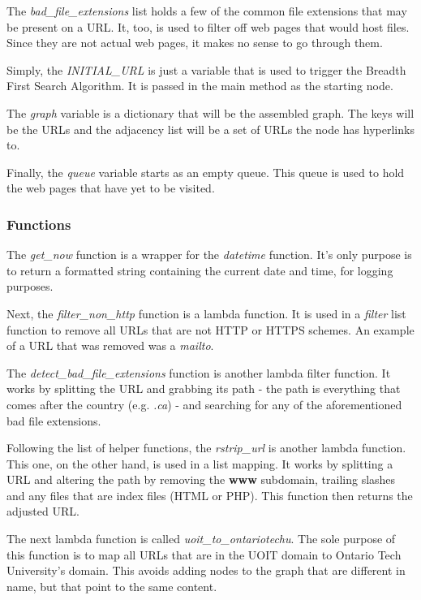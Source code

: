 The \textit{bad\_file\_extensions} list holds a few of the common file extensions that may be present on a URL. It, too, is used to filter off web pages that would host files. Since they are not actual web pages, it makes no sense to go through them.

Simply, the \textit{INITIAL\_URL} is just a variable that is used to trigger the Breadth First Search Algorithm. It is passed in the main method as the starting node.

The \textit{graph} variable is a dictionary that will be the assembled graph. The keys will be the URLs and the adjacency list will be a set of URLs the node has hyperlinks to.

Finally, the \textit{queue} variable starts as an empty queue. This queue is used to hold the web pages that have yet to be visited.

\subsubsection{Functions}
The \textit{get\_now} function is a wrapper for the \textit{datetime} function. It's only purpose is to return a formatted string containing the current date and time, for logging purposes.

Next, the \textit{filter\_non\_http} function is a lambda function. It is used in a \textit{filter} list function to remove all URLs that are not HTTP or HTTPS schemes. An example of a URL that was removed was a \textit{mailto}.

The \textit{detect\_bad\_file\_extensions} function is another lambda filter function. It works by splitting the URL and grabbing its path - the path is everything that comes after the country (e.g. \textit{.ca}) - and searching for any of the aforementioned bad file extensions.

Following the list of helper functions, the \textit{rstrip\_url} is another lambda function. This one, on the other hand, is used in a list mapping. It works by splitting a URL and altering the path by removing the \textbf{www} subdomain, trailing slashes and any files that are index files (HTML or PHP). This function then returns the adjusted URL.

The next lambda function is called \textit{uoit\_to\_ontariotechu}. The sole purpose of this function is to map all URLs that are in the UOIT domain to Ontario Tech University's domain. This avoids adding nodes to the graph that are different in name, but that point to the same content.

